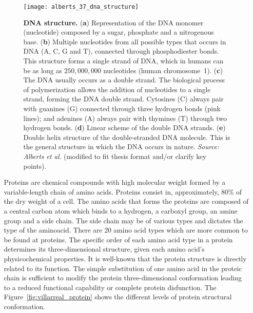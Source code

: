 \begin{figure}[h!]
\centering
\texttt{[image: alberts\_37\_dna\_structure]}
\caption[DNA structure]{\textbf{DNA structure.} (\textbf{a}) Representation of the DNA monomer (nucleotide) composed by a sugar, phosphate and a nitrogenous base. (\textbf{b}) Multiple nucleotides from all possible types that occurs in DNA (A, C, G and T), connected through phosphodiester bonds. This structure forms a single strand of DNA, which  in humans can be as long as \approxy$250,000,000$ nucleotides (human chromosome~1). (\textbf{c}) The DNA usually occurs as a double strand. The biological process of polymerization allows the addition of nucleotides to a single strand, forming the DNA double strand. Cytosines (C) always pair with guanines (G) connected through three hydrogen bonds (pink lines); and adenines (A) always pair with thymines (T) through two hydrogen bonds. (\textbf{d}) Linear scheme of the double DNA strands. (\textbf{e}) Double helix structure of the double-stranded DNA molecule. This is the general structure in which the DNA occurs in nature. \emph{Source: Alberts et al.}\cite{alberts2007} (modified to fit thesis format and/or clarify key points).}
\label{fig:alberts_dna_structure}
\end{figure}

Proteins are chemical compounds with high molecular weight formed by a variable-length chain of amino acids. Proteins consist in, approximately, $80\%$ of the dry weight of a cell. The amino acids that forms the proteins are composed of a central carbon atom which binds to a hydrogen, a carboxyl group, an amine group and a side chain. The side chain may be of various types and dictates the type of the aminoacid. There are 20 amino acid types which are more common to be found at proteins. The specific order of each amino acid type in a protein determines its three-dimensional structure, given each amino acid's physicochemical properties. It is well-known that the protein structure is directly related to its function. The simple substitution of one amino acid in the proteic chain is sufficient to modify the protein three-dimensional conformation leading to a reduced functional capability or complete protein disfunction. The Figure~\ref{fig:villarreal_protein} shows the different levels of protein structural conformation.

